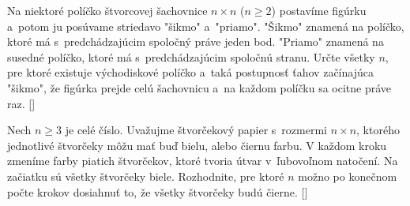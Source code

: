 {Na niektoré políčko štvorcovej šachovnice $n\times n$ ($n\geq 2$)
postavíme figúrku a~potom ju posúvame striedavo "šikmo" a~"priamo".
"Šikmo" znamená na políčko, ktoré má s~predchádzajúcim spoločný práve
jeden bod. "Priamo" znamená na susedné políčko, ktoré má
s~predchádzajúcim spoločnú stranu. Určte všetky $n$, pre ktoré
existuje východiskové políčko a~taká postupnosť ťahov začínajúca "šikmo",
že figúrka prejde celú šachovnicu a~na každom políčku sa ocitne
práve raz.
[]

Nech $n \geq 3$ je celé číslo. Uvažujme štvorčekový papier s~rozmermi $n \times n$, ktorého jednotlivé štvorčeky môžu mať buď bielu, alebo čiernu farbu. V každom kroku zmeníme farby piatich štvorčekov, ktoré tvoria útvar
\baselineskip\hbox{}
v~ľubovoľnom natočení. Na začiatku sú všetky štvorčeky biele. Rozhodnite, pre ktoré $n$ možno po konečnom počte krokov dosiahnuť to, že všetky štvorčeky budú čierne. []


}

